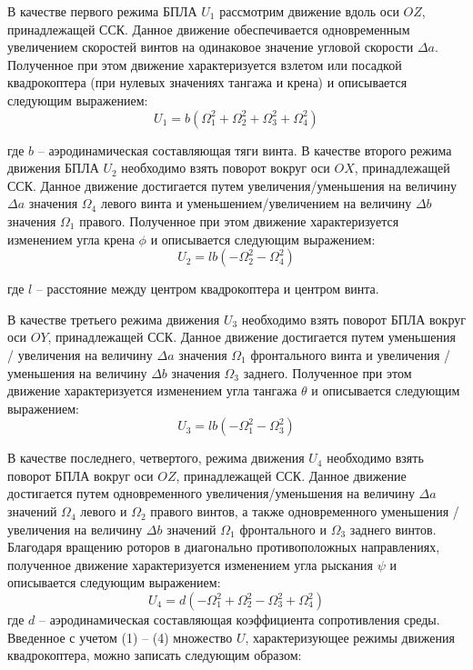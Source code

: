 В качестве первого режима БПЛА \(U_{1}\) рассмотрим движение вдоль оси \(OZ\), принадлежащей ССК. Данное движение обеспечивается одновременным увеличением скоростей винтов на одинаковое значение угловой скорости \(\Delta a\). Полученное при этом движение характеризуется взлетом или посадкой квадрокоптера (при нулевых значениях тангажа и крена) и описывается следующим выражением:
\begin{equation}
U_{1}=b(\Omega_{1}^2+\Omega_{2}^2+\Omega_{3}^2+\Omega_{4}^2)
\end{equation}

где \(b\) -- аэродинамическая составляющая тяги винта.
В качестве второго режима движения БПЛА \(U_{2}\) необходимо взять поворот вокруг оси \(OX\), принадлежащей ССК. Данное движение достигается путем увеличения/уменьшения на величину \(\Delta a\) значения \(\Omega_{4}\) левого винта и уменьшением/увеличением на величину \(\Delta b\) значения \(\Omega_{1}\)
правого. Полученное при этом движение характеризуется изменением угла крена \(\phi\) и описывается следующим выражением:
\begin{equation}
U_{2}=lb(-\Omega_{2}^2-\Omega_{4}^2)
\end{equation}

где \(l\) -- расстояние между центром квадрокоптера и центром винта.

В качестве третьего режима движения \(U_{3}\) необходимо взять поворот БПЛА вокруг оси \(OY\), принадлежащей ССК. Данное движение достигается путем уменьшения / увеличения на величину \(\Delta a\) значения \(\Omega_{1}\) фронтального винта и увеличения / уменьшения на величину \(\Delta b\) значения \(\Omega_{3}\) заднего. Полученное при этом движение характеризуется изменением угла тангажа \(\theta\) и описывается следующим выражением:
\begin{equation}
U_{3}=lb(-\Omega_{1}^2-\Omega_{3}^2)
\end{equation}

В качестве последнего, четвертого, режима движения \(U_{4}\) необходимо взять поворот БПЛА вокруг оси \(OZ\), принадлежащей ССК. Данное движение достигается путем одновременного увеличения/уменьшения на величину \(\Delta a\) значений \(\Omega_{4}\) левого и \(\Omega_{2}\) правого винтов, а также одновременного уменьшения / увеличения на величину \(\Delta b\) значений \(\Omega_{1}\) фронтального и \(\Omega_{3}\) заднего винтов. Благодаря вращению роторов в диагонально противоположных направлениях, полученное движение характеризуется изменением угла рыскания \(\psi\) и описывается следующим выражением:
\begin{equation}
U_{4}=d(-\Omega_{1}^2+\Omega_{2}^2-\Omega_{3}^2+\Omega_{4}^2)
\end{equation}
где \(d\) -- аэродинамическая составляющая коэффициента сопротивления среды.
Введенное с учетом (1) -- (4) множество \(U\), характеризующее режимы
движения квадрокоптера, можно записать следующим образом:

